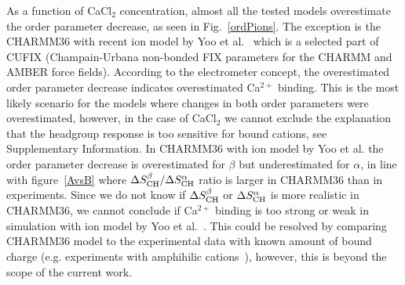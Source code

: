 \documentclass[pre,aps,floatfix,authordate1-4,twocolumn]{revtex4-1}
\begin{document}



As a function of CaCl$_2$ concentration, almost all the tested models overestimate the order parameter decrease,
as seen in Fig.~\ref{ordPions}. The exception is the CHARMM36 with recent ion model by Yoo et al.~\cite{yoo16} which is a selected
part of CUFIX (Champain-Urbana non-bonded FIX parameters for the CHARMM and AMBER force fields).
According to the electrometer concept, the overestimated order parameter decrease indicates overestimated Ca$^{2+}$ binding. 
This is the most likely scenario for the models where changes in both order parameters were overestimated,
however, in the case of CaCl$_2$ we cannot exclude the explanation that the headgroup response is too sensitive for
bound cations, see Supplementary Information. In CHARMM36 with ion model by Yoo et al. the order parameter decrease is overestimated for $\beta$ 
but underestimated for  $\alpha$, in line with figure~\ref{AvsB} where $\Delta S_{\rm{CH}}^{\beta}/\Delta S_{\rm{CH}}^{\alpha}$ 
ratio is larger in CHARMM36 than in experiments. Since we do not know if $\Delta S_{\rm{CH}}^{\beta}$ or $\Delta S_{\rm{CH}}^{\alpha}$
is more realistic in CHARMM36, we cannot conclude if Ca$^{2+}$ binding is too strong or weak in simulation with ion model by Yoo et al.~\cite{yoo16}.
This could be resolved by comparing CHARMM36 model to the experimental data with known amount of bound charge 
(e.g. experiments with amphihilic cations~\cite{scherer89,franzin98}), however, this is beyond the scope of the
current work. 

\end{document}
